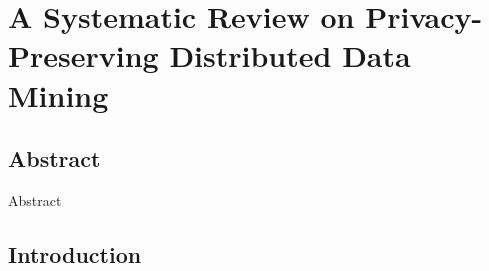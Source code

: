 \chapter{A Systematic Review on Privacy-Preserving Distributed Data Mining}


\clearpage
\begin{refsection}
\section*{Abstract}
Abstract
\section{Introduction}

\end{refsection}


